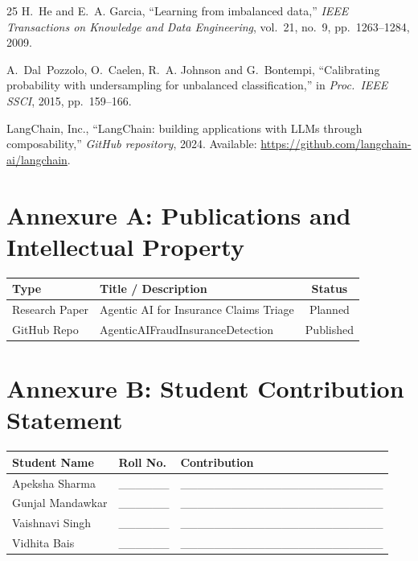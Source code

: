 \documentclass[12pt,a4paper]{article}
\begin{document}
\begin{thebibliography}{25}
H.~He and E.~A. Garcia, ``Learning from imbalanced data,'' \textit{IEEE Transactions on Knowledge and Data Engineering}, vol.~21, no.~9, pp.~1263--1284, 2009.

A.~Dal~Pozzolo, O.~Caelen, R.~A. Johnson and G.~Bontempi, ``Calibrating probability with undersampling for unbalanced classification,'' in \textit{Proc.\ IEEE SSCI}, 2015, pp.~159--166.

LangChain, Inc., ``LangChain: building applications with LLMs through composability,'' \textit{GitHub repository}, 2024. Available: \url{https://github.com/langchain-ai/langchain}.

\end{thebibliography}


\newpage
\section*{Annexure A: Publications and Intellectual Property}

\begin{table}[H]
\centering
\begin{tabular}{@{}llc@{}}
\toprule
\textbf{Type} & \textbf{Title / Description} & \textbf{Status} \\
\midrule
Research Paper & Agentic AI for Insurance Claims Triage & Planned \\
GitHub Repo    & AgenticAIFraudInsuranceDetection & Published \\
\bottomrule
\end{tabular}
\end{table}


\newpage
\section*{Annexure B: Student Contribution Statement}

\begin{table}[H]
\centering
\begin{tabular}{@{}llp{8cm}@{}}
\toprule
\textbf{Student Name} & \textbf{Roll No.} & \textbf{Contribution} \\
\midrule
Apeksha Sharma   & \_\_\_\_\_\_ & \_\_\_\_\_\_\_\_\_\_\_\_\_\_\_\_\_\_\_\_\_\_\_\_ \\
Gunjal Mandawkar & \_\_\_\_\_\_ & \_\_\_\_\_\_\_\_\_\_\_\_\_\_\_\_\_\_\_\_\_\_\_\_ \\
Vaishnavi Singh  & \_\_\_\_\_\_ & \_\_\_\_\_\_\_\_\_\_\_\_\_\_\_\_\_\_\_\_\_\_\_\_ \\
Vidhita Bais     & \_\_\_\_\_\_ & \_\_\_\_\_\_\_\_\_\_\_\_\_\_\_\_\_\_\_\_\_\_\_\_ \\
\bottomrule
\end{tabular}
\end{table}
\end{document}
